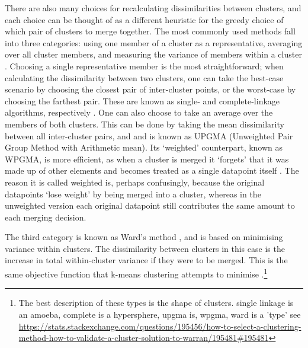 There are also many choices for recalculating dissimilarities between clusters, and each choice can be thought of as a different heuristic for the greedy choice of which pair of clusters to merge together.
The most commonly used methods fall into three categories: using one member of a cluster as a representative, averaging over all cluster members, and measuring the variance of members within a cluster \cite{Roux2018}.
Choosing a single representative member is the most straightforward; when calculating the dissimilarity between two clusters, one can take the best-case scenario by choosing the closest pair of inter-cluster points, or the worst-case by choosing the farthest pair. These are known as single- and complete-linkage algorithms, respectively \cite{Sibson1973, Defays1977}.
One can also choose to take an average over the members of both clusters. This can be done by taking the mean dissimilarity between all inter-cluster pairs, and and is known as UPGMA (Unweighted Pair Group Method with Arithmetic mean). Its `weighted' counterpart, known as WPGMA, is more efficient, as when a cluster is merged it `forgets' that it was made up of other elements and becomes treated as a single datapoint itself \cite{Sneath1973}. The reason it is called weighted is, perhaps confusingly, because the original datapoints `lose weight' by being merged into a cluster, whereas in the unweighted version each original datapoint still contributes the same amount to each merging decision.

The third category is known as Ward's method \cite{WardJr1963}, and is based on minimising variance within clusters. The dissimilarity between clusters in this case is the increase in total within-cluster variance if they were to be merged. This is the same objective function that k-means clustering attempts to minimise \cite{Friedman2001a}.\footnote{The best description of these types is the shape of clusters. single linkage is an amoeba, complete is a hypersphere, upgma is, wpgma, ward is a 'type' see \url{https://stats.stackexchange.com/questions/195456/how-to-select-a-clustering-method-how-to-validate-a-cluster-solution-to-warran/195481\#195481}}


